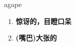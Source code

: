 
\begin{frame}
{\huge agape}
\begin{center}
\begin{enumerate}\Large
  \item \textbf{惊讶的，目瞪口呆}
  \item \textbf{(嘴巴)大张的}
\end{enumerate}
\end{center}
\end{frame}
